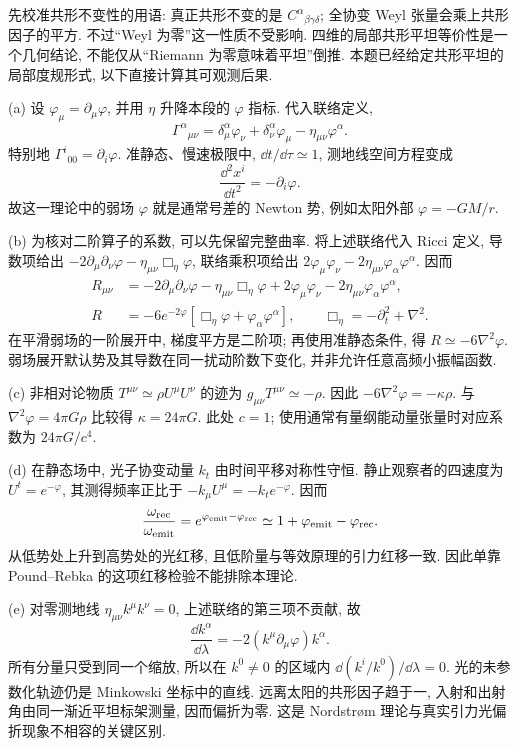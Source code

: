 \begin{solution}
先校准共形不变性的用语: 真正共形不变的是 $C^\alpha{}_{\beta\gamma\delta}$; 全协变 Weyl 张量会乘上共形因子的平方. 不过“Weyl 为零”这一性质不受影响. 四维的局部共形平坦等价性是一个几何结论, 不能仅从“Riemann 为零意味着平坦”倒推. 本题已经给定共形平坦的局部度规形式, 以下直接计算其可观测后果.

(a) 设 $\varphi_\mu=\partial_\mu\varphi$, 并用 $\eta$ 升降本段的 $\varphi$ 指标. 代入联络定义,
\[
\Gamma^\alpha{}_{\mu\nu}
=\delta^\alpha_\mu\varphi_\nu+\delta^\alpha_\nu\varphi_\mu
-\eta_{\mu\nu}\varphi^\alpha.
\]
特别地 $\Gamma^i{}_{00}=\partial_i\varphi$. 准静态、慢速极限中, $\dd t/\dd\tau\simeq1$, 测地线空间方程变成
\[
\frac{\dd^2x^i}{\dd t^2}=-\partial_i\varphi.
\]
故这一理论中的弱场 $\varphi$ 就是通常号差的 Newton 势, 例如太阳外部 $\varphi=-GM/r$.

(b) 为核对二阶算子的系数, 可以先保留完整曲率. 将上述联络代入 Ricci 定义, 导数项给出 $-2\partial_\mu\partial_\nu\varphi-\eta_{\mu\nu}\Box_\eta\varphi$, 联络乘积项给出 $2\varphi_\mu\varphi_\nu-2\eta_{\mu\nu}\varphi_\alpha\varphi^\alpha$. 因而
\begin{align*}
R_{\mu\nu}&=-2\partial_\mu\partial_\nu\varphi-\eta_{\mu\nu}\Box_\eta\varphi
+2\varphi_\mu\varphi_\nu-2\eta_{\mu\nu}\varphi_\alpha\varphi^\alpha,\\
R&=-6e^{-2\varphi}\left[\Box_\eta\varphi+\varphi_\alpha\varphi^\alpha\right],
\qquad \Box_\eta=-\partial_t^2+\nabla^2.
\end{align*}
在平滑弱场的一阶展开中, 梯度平方是二阶项; 再使用准静态条件, 得 $R\simeq-6\nabla^2\varphi$. 弱场展开默认势及其导数在同一扰动阶数下变化, 并非允许任意高频小振幅函数.

(c) 非相对论物质 $T^{\mu\nu}\simeq\rho U^\mu U^\nu$ 的迹为 $g_{\mu\nu}T^{\mu\nu}\simeq-\rho$. 因此 $-6\nabla^2\varphi=-\kappa\rho$. 与 $\nabla^2\varphi=4\pi G\rho$ 比较得 $\kappa=24\pi G$. 此处 $c=1$; 使用通常有量纲能动量张量时对应系数为 $24\pi G/c^4$.

(d) 在静态场中, 光子协变动量 $k_t$ 由时间平移对称性守恒. 静止观察者的四速度为 $U^t=e^{-\varphi}$, 其测得频率正比于 $-k_\mu U^\mu=-k_te^{-\varphi}$. 因而
\[
\frac{\omega_{\rm rec}}{\omega_{\rm emit}}
=e^{\varphi_{\rm emit}-\varphi_{\rm rec}}
\simeq1+\varphi_{\rm emit}-\varphi_{\rm rec}.
\]
从低势处上升到高势处的光红移, 且低阶量与等效原理的引力红移一致. 因此单靠 Pound--Rebka 的这项红移检验不能排除本理论.

(e) 对零测地线 $\eta_{\mu\nu}k^\mu k^\nu=0$, 上述联络的第三项不贡献, 故
\[
\frac{\dd k^\alpha}{\dd\lambda}
=-2(k^\mu\partial_\mu\varphi)k^\alpha.
\]
所有分量只受到同一个缩放, 所以在 $k^0\ne0$ 的区域内 $\dd(k^i/k^0)/\dd\lambda=0$. 光的未参数化轨迹仍是 Minkowski 坐标中的直线. 远离太阳的共形因子趋于一, 入射和出射角由同一渐近平坦标架测量, 因而偏折为零. 这是 Nordstr\o m 理论与真实引力光偏折现象不相容的关键区别.
\end{solution}

